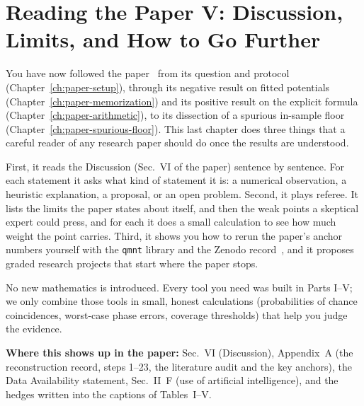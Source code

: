 \chapter{Reading the Paper V: Discussion, Limits, and How to Go Further}\label{ch:paper-critique}

\begin{chapterintro}
You have now followed the paper~\cite{soniR1} from its question and protocol (Chapter~\ref{ch:paper-setup}), through its negative result on fitted potentials (Chapter~\ref{ch:paper-memorization}) and its positive result on the explicit formula (Chapter~\ref{ch:paper-arithmetic}), to its dissection of a spurious in-sample floor (Chapter~\ref{ch:paper-spurious-floor}). This last chapter does three things that a careful reader of any research paper should do once the results are understood.

First, it reads the Discussion (Sec.~VI of the paper) sentence by sentence. For each statement it asks what kind of statement it is: a numerical observation, a heuristic explanation, a proposal, or an open problem. Second, it plays referee. It lists the limits the paper states about itself, and then the weak points a skeptical expert could press, and for each it does a small calculation to see how much weight the point carries. Third, it shows you how to rerun the paper's anchor numbers yourself with the \texttt{qmnt} library and the Zenodo record~\cite{zenodo}, and it proposes graded research projects that start where the paper stops.

No new mathematics is introduced. Every tool you need was built in Parts I--V; we only combine those tools in small, honest calculations (probabilities of chance coincidences, worst-case phase errors, coverage thresholds) that help you judge the evidence.

\textbf{Where this shows up in the paper:} Sec.~VI (Discussion), Appendix~A (the reconstruction record, steps 1--23, the literature audit and the key anchors), the Data Availability statement, Sec.~II~F (use of artificial intelligence), and the hedges written into the captions of Tables~I--V.
\end{chapterintro}


